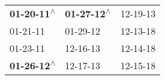 \begin{supertabular}{lll}
 \textbf{01-20-11\textsuperscript{$\wedge$}} &  \textbf{01-27-12\textsuperscript{$\wedge$}} &  12-19-13\textsuperscript{} \\
                  01-21-11\textsuperscript{} &                   01-29-12\textsuperscript{} &  12-13-18\textsuperscript{} \\
                  01-23-11\textsuperscript{} &                   12-16-13\textsuperscript{} &  12-14-18\textsuperscript{} \\
 \textbf{01-26-12\textsuperscript{$\wedge$}} &                   12-17-13\textsuperscript{} &  12-15-18\textsuperscript{} \\
\end{supertabular}

